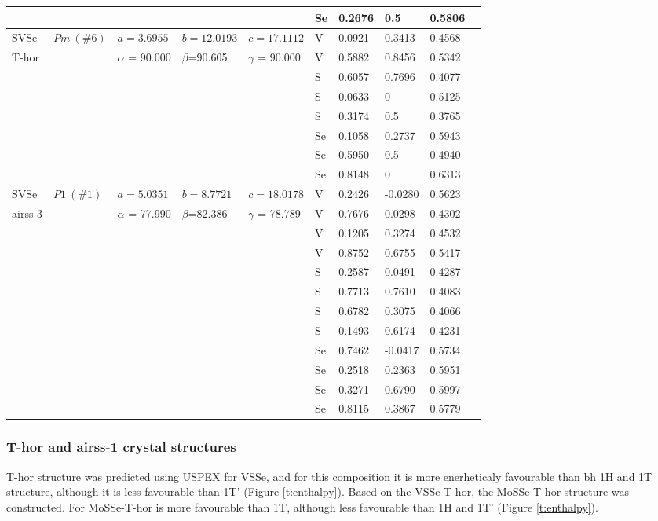 \documentclass[a4paperm]{article}
\begin{document}
\begin{table}[H]
\begin{tabular}{l*{9}{l}}
		&&&&& Se	&	0.2676	&	0.5	&	0.5806	\\
		\hline
		SVSe & $Pm\ (\#6)$  &	$a=3.6955$ & $b=12.0193$ & $c=17.1112$  & V	&	0.0921	&	0.3413	&	0.4568	\\
		T-hor&&$\alpha$ = 90.000& $\beta$=90.605& $\gamma$ = 90.000& V	&	0.5882	&	0.8456	&	0.5342	\\
		&&&&&	S	&	0.6057	&	0.7696	&	0.4077	\\
		&&&&&	S	&	0.0633	&	0		&	0.5125	\\
		&&&&&	S	&	0.3174	&	0.5		&	0.3765	\\
		&&&&&	Se	&	0.1058	&	0.2737	&	0.5943	\\
		&&&&&	Se	&	0.5950	&	0.5		&	0.4940	\\
		&&&&&	Se	&	0.8148	&	0		&	0.6313	\\
		\hline
		SVSe & $P1\ (\#1)$  &	$a=5.0351$ & $b=8.7721$ & $c=18.0178$  & V	&	0.2426	&	-0.0280	&	0.5623	\\
		airss-3&&$\alpha$ = 77.990& $\beta$=82.386& $\gamma$ = 78.789  & V	&	0.7676	&	0.0298	&	0.4302	\\		
		&&&&&	V	&	0.1205	&	0.3274	&	0.4532	\\
		&&&&&	V	&	0.8752	&	0.6755	&	0.5417	\\
		&&&&&	S	&	0.2587	&	0.0491	&	0.4287	\\
		&&&&&	S	&	0.7713	&	0.7610	&	0.4083	\\
		&&&&&	S	&	0.6782	&	0.3075	&	0.4066	\\
		&&&&&	S	&	0.1493	&	0.6174	&	0.4231	\\
		&&&&&	Se	&	0.7462	&	-0.0417	&	0.5734	\\
		&&&&&	Se	&	0.2518	&	0.2363	&	0.5951	\\
		&&&&&	Se	&	0.3271	&	0.6790	&	0.5997	\\
		&&&&&	Se	&	0.8115	&	0.3867	&	0.5779	\\
		\hline
	\end{tabular}
\end{table}


\subsubsection{T-hor and airss-1 crystal structures}
T-hor structure was predicted using USPEX for VSSe, and for this composition it is more  enerheticaly favourable than bh 1H and 1T structure, although it is less favourable than 1T' (Figure \ref{t:enthalpy}).
Based on the VSSe-T-hor, the MoSSe-T-hor structure was constructed.
For MoSSe-T-hor is more favourable than 1T, although less favourable than 1H and 1T' (Figure \ref{t:enthalpy}).
\end{document}

